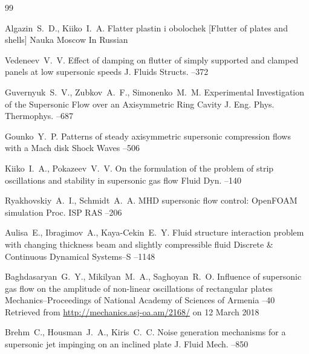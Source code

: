 \begin{thebibliography}{99}

\by Algazin~S.~D., Kiiko~I.~A.
\book Flatter plastin i obolochek \rm [Flutter of plates and shells]
\publ Nauka
\publaddr Moscow
\lang In Russian


\by Vedeneev~V.~V.
\paper Effect of damping on flutter of simply supported and clamped panels at low supersonic speeds
\jour J. Fluids Structs.
--372

\by Guvernyuk~S.~V., Zubkov~A.~F., Simonenko~M.~M.
\paper Experimental Investigation of the Supersonic Flow over an Axisymmetric Ring Cavity
\jour J. Eng. Phys. Thermophys.
--687

\by Gounko~Y.~P.
\paper Patterns of steady axisymmetric supersonic compression flows with a Mach disk
\jour Shock Waves
–506

\by Kiiko~I.~A., Pokazeev~V.~V. 
\paper On the formulation of the problem of strip oscillations and stability in supersonic gas flow
\jour Fluid Dyn.
--140

\by Ryakhovskiy~A.~I., Schmidt~A.~A.
\paper MHD supersonic flow control: OpenFOAM simulation
\jour Proc. ISP RAS
--206
 
\by Aulisa~E., Ibragimov~A., Kaya-Cekin~E.~Y.
\paper Fluid structure interaction problem with changing thickness beam and slightly compressible fluid
\jour Discrete \& Continuous Dynamical Systems--S
--1148

\by Baghdasaryan~G.~Y., Mikilyan~M.~A., Saghoyan~R.~O.
\paper Influence of supersonic gas flow on the amplitude of non-linear oscillations of rectangular plates
\jour Mechanics--Proceedings of National Academy of Sciences of Armenia
--40
\elink Retrieved from \url{http://mechanics.asj-oa.am/2168/} on 12 March 2018
	


\by Brehm~C., Housman~J.~A., Kiris~C.~C.
\paper Noise generation mechanisms for a supersonic jet impinging on an inclined plate
\jour J. Fluid Mech.
--850


\end{thebibliography}
